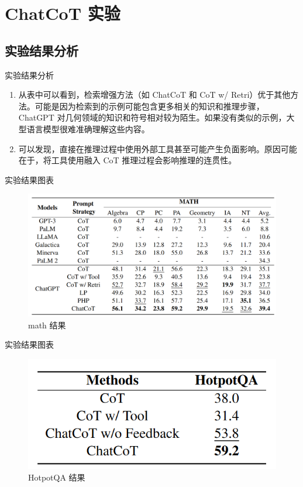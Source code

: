 \section{ChatCoT 实验}
\subsection{实验结果分析}
\begin{frame}{实验结果分析}
    \begin{enumerate}
        \item 从表中可以看到，检索增强方法（如 ChatCoT 和 CoT w/ Retri）优于其他方法。可能是因为检索到的示例可能包含更多相关的知识和推理步骤，ChatGPT 对几何领域的知识和符号相对较为陌生。如果没有类似的示例，大型语言模型很难准确理解这些内容。
        
        \pause
        \item 可以发现，直接在推理过程中使用外部工具甚至可能产生负面影响。原因可能在于，将工具使用融入 CoT 推理过程会影响推理的连贯性。
    \end{enumerate}
\end{frame}

\begin{frame}{实验结果图表}
    \begin{figure}
        \centering
        \includegraphics[width=.7\linewidth]{./pic/math.png}
        \caption{math 结果}
        \label{fig:result1}
    \end{figure}
\end{frame}
\begin{frame}{实验结果图表}
    \begin{figure}
        \centering
        \includegraphics[width=.7\linewidth]{./pic/hotpotqa.png}
        \caption{HotpotQA 结果}
        \label{fig:result2}
    \end{figure}
\end{frame}

